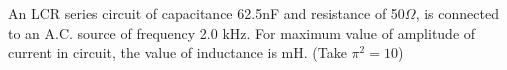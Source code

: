 \item An LCR series circuit of capacitance 62.5nF and resistance of 50$\Omega$, is connected to an A.C. source of frequency 2.0 kHz. For maximum value of amplitude of current in circuit, the value of inductance is \underline{\hspace{4cm}} mH. (Take $\pi^2 = 10$)